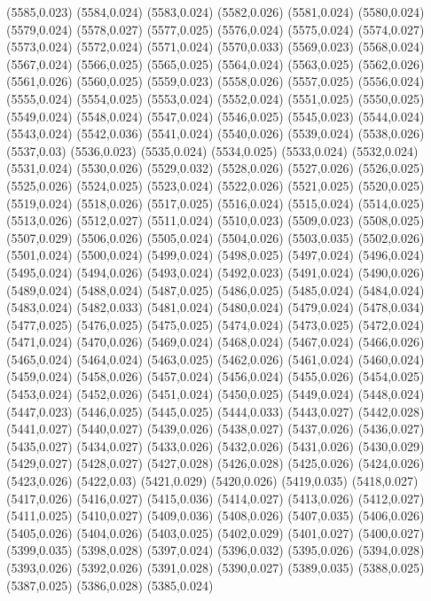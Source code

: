 (5585,0.023)
(5584,0.024)
(5583,0.024)
(5582,0.026)
(5581,0.024)
(5580,0.024)
(5579,0.024)
(5578,0.027)
(5577,0.025)
(5576,0.024)
(5575,0.024)
(5574,0.027)
(5573,0.024)
(5572,0.024)
(5571,0.024)
(5570,0.033)
(5569,0.023)
(5568,0.024)
(5567,0.024)
(5566,0.025)
(5565,0.025)
(5564,0.024)
(5563,0.025)
(5562,0.026)
(5561,0.026)
(5560,0.025)
(5559,0.023)
(5558,0.026)
(5557,0.025)
(5556,0.024)
(5555,0.024)
(5554,0.025)
(5553,0.024)
(5552,0.024)
(5551,0.025)
(5550,0.025)
(5549,0.024)
(5548,0.024)
(5547,0.024)
(5546,0.025)
(5545,0.023)
(5544,0.024)
(5543,0.024)
(5542,0.036)
(5541,0.024)
(5540,0.026)
(5539,0.024)
(5538,0.026)
(5537,0.03)
(5536,0.023)
(5535,0.024)
(5534,0.025)
(5533,0.024)
(5532,0.024)
(5531,0.024)
(5530,0.026)
(5529,0.032)
(5528,0.026)
(5527,0.026)
(5526,0.025)
(5525,0.026)
(5524,0.025)
(5523,0.024)
(5522,0.026)
(5521,0.025)
(5520,0.025)
(5519,0.024)
(5518,0.026)
(5517,0.025)
(5516,0.024)
(5515,0.024)
(5514,0.025)
(5513,0.026)
(5512,0.027)
(5511,0.024)
(5510,0.023)
(5509,0.023)
(5508,0.025)
(5507,0.029)
(5506,0.026)
(5505,0.024)
(5504,0.026)
(5503,0.035)
(5502,0.026)
(5501,0.024)
(5500,0.024)
(5499,0.024)
(5498,0.025)
(5497,0.024)
(5496,0.024)
(5495,0.024)
(5494,0.026)
(5493,0.024)
(5492,0.023)
(5491,0.024)
(5490,0.026)
(5489,0.024)
(5488,0.024)
(5487,0.025)
(5486,0.025)
(5485,0.024)
(5484,0.024)
(5483,0.024)
(5482,0.033)
(5481,0.024)
(5480,0.024)
(5479,0.024)
(5478,0.034)
(5477,0.025)
(5476,0.025)
(5475,0.025)
(5474,0.024)
(5473,0.025)
(5472,0.024)
(5471,0.024)
(5470,0.026)
(5469,0.024)
(5468,0.024)
(5467,0.024)
(5466,0.026)
(5465,0.024)
(5464,0.024)
(5463,0.025)
(5462,0.026)
(5461,0.024)
(5460,0.024)
(5459,0.024)
(5458,0.026)
(5457,0.024)
(5456,0.024)
(5455,0.026)
(5454,0.025)
(5453,0.024)
(5452,0.026)
(5451,0.024)
(5450,0.025)
(5449,0.024)
(5448,0.024)
(5447,0.023)
(5446,0.025)
(5445,0.025)
(5444,0.033)
(5443,0.027)
(5442,0.028)
(5441,0.027)
(5440,0.027)
(5439,0.026)
(5438,0.027)
(5437,0.026)
(5436,0.027)
(5435,0.027)
(5434,0.027)
(5433,0.026)
(5432,0.026)
(5431,0.026)
(5430,0.029)
(5429,0.027)
(5428,0.027)
(5427,0.028)
(5426,0.028)
(5425,0.026)
(5424,0.026)
(5423,0.026)
(5422,0.03)
(5421,0.029)
(5420,0.026)
(5419,0.035)
(5418,0.027)
(5417,0.026)
(5416,0.027)
(5415,0.036)
(5414,0.027)
(5413,0.026)
(5412,0.027)
(5411,0.025)
(5410,0.027)
(5409,0.036)
(5408,0.026)
(5407,0.035)
(5406,0.026)
(5405,0.026)
(5404,0.026)
(5403,0.025)
(5402,0.029)
(5401,0.027)
(5400,0.027)
(5399,0.035)
(5398,0.028)
(5397,0.024)
(5396,0.032)
(5395,0.026)
(5394,0.028)
(5393,0.026)
(5392,0.026)
(5391,0.028)
(5390,0.027)
(5389,0.035)
(5388,0.025)
(5387,0.025)
(5386,0.028)
(5385,0.024)
